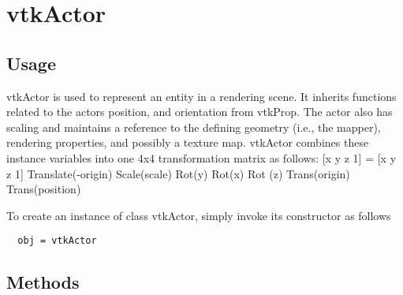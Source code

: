 \section{vtkActor}

\subsection{Usage}

 
 vtkActor is used to represent an entity in a rendering scene.  It inherits
 functions related to the actors position, and orientation from
 vtkProp. The actor also has scaling and maintains a reference to the
 defining geometry (i.e., the mapper), rendering properties, and possibly a
 texture map. vtkActor combines these instance variables into one 4x4
 transformation matrix as follows: [x y z 1] = [x y z 1] Translate(-origin)
 Scale(scale) Rot(y) Rot(x) Rot (z) Trans(origin) Trans(position)

To create an instance of class vtkActor, simply
invoke its constructor as follows
\begin{verbatim}
  obj = vtkActor
\end{verbatim}
\subsection{Methods}

